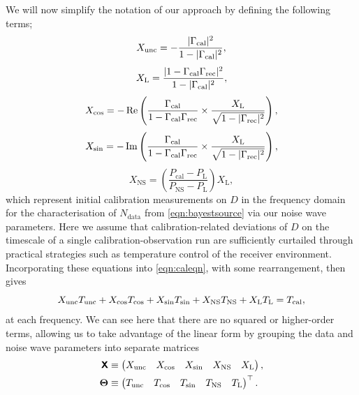 We will now simplify the notation of our approach by defining the following terms;
\begin{equation}\label{eqn:xunc}
    X_{\mathrm{unc}} = -\frac{|\Gamma_{\mathrm{cal}}|^2}{ 1-|\Gamma_{\mathrm{cal}}|^2}, 
\end{equation}
\begin{equation}\label{eqn:xl}
    X_{\mathrm{L}} = \frac{|1-\Gamma_{\mathrm{cal}}\Gamma_{\mathrm{rec}}|^2}{1-|\Gamma_{\mathrm{cal}}|^2},
\end{equation}
\begin{equation}\label{eqn:xcos}
    X_{\mathrm{cos}} = -\operatorname{Re}\left(\frac{\Gamma_{\mathrm{cal}}}{1-\Gamma_{\mathrm{cal}}\Gamma_{\mathrm{rec}}} \times \frac{X_{\mathrm{L}}}{\sqrt{1-|\Gamma_{\mathrm{rec}}|^2}}\right),
\end{equation}
\begin{equation}\label{eqn:xsin}
    X_{\mathrm{sin}} = -\operatorname{Im}\left(\frac{\Gamma_{\mathrm{cal}}}{1-\Gamma_{\mathrm{cal}}\Gamma_{\mathrm{rec}}} \times \frac{X_{\mathrm{L}}}{\sqrt{1-|\Gamma_{\mathrm{rec}}|^2}}\right),
\end{equation}
\begin{equation}\label{eqn:xns}
    X_{\mathrm{NS}} = \left( \frac{P_{\mathrm{cal}}-P_{\mathrm{L}}}{P_{\mathrm{NS}}-P_{\mathrm{L}}} \right) X_{\mathrm{L}},
\end{equation}
which represent initial calibration measurements on $D$ in the frequency domain for the characterisation of $N_{\mathrm{data}}$ from \cref{eqn:bayestsource} via our noise wave parameters. Here we assume that calibration-related deviations of $D$ on the timescale of a single calibration-observation run are sufficiently curtailed through practical strategies such as temperature control of the receiver environment. Incorporating these equations into \cref{eqn:caleqn}, with some rearrangement, then gives
\begin{equation}
    X_{\mathrm{unc}}T_{\mathrm{unc}} + X_{\mathrm{cos}}T_{\mathrm{cos}} + X_{\mathrm{sin}}T_{\mathrm{sin}} + X_{\mathrm{NS}}T_{\mathrm{NS}} + X_{\mathrm{L}}T_{\mathrm{L}} = T_{\mathrm{cal}},
    \label{eqn:almost_expanded_cal_eqn}
\end{equation}
at each frequency. We can see here that there are no squared or higher-order terms, allowing us to take advantage of the linear form by grouping the data and noise wave parameters into separate matrices
\begin{equation} \label{eqn:theta}
    \begin{split}
    \textbf{\textsf{X}} &\equiv \begin{pmatrix} 
        X_\mathrm{unc} \quad 
        X_\mathrm{cos} \quad
        X_\mathrm{sin} \quad
        X_\mathrm{NS} \quad
        X_\mathrm{L} \end{pmatrix}, \\
    \boldsymbol{\Theta} &\equiv \begin{pmatrix} 
        T_\mathrm{unc}\quad
        T_\mathrm{cos}\quad
        T_\mathrm{sin}\quad
        T_\mathrm{NS}\quad
        T_\mathrm{L}\end{pmatrix}^\top.
    \end{split}
\end{equation}

